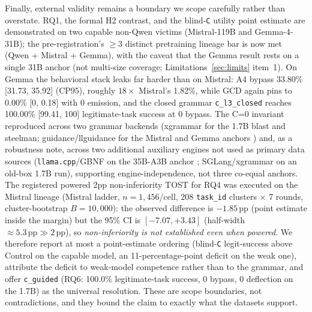 Finally, external validity remains a boundary we scope carefully rather than overstate. RQ1, the formal H2 contrast, and the blind-\texttt{C} utility point estimate are demonstrated on two capable non-Qwen victims (Mistral-119B and Gemma-4-31B); the pre-registration's \(\ge 3\) distinct pretraining lineage bar is now met (Qwen + Mistral + Gemma), with the caveat that the Gemma result rests on a single 31B anchor (not multi-size coverage; Limitations~\ref{sec:limits} item~1). On Gemma the behavioral stack leaks far harder than on Mistral: A4 bypass 33.80\% [31.73, 35.92] (CP95), roughly \(18\times\) Mistral's 1.82\%, while GCD again pins to 0.00\% [0, 0.18] with 0 emission, and the closed grammar \texttt{c\_l3\_closed} reaches 100.00\% [99.41, 100] legitimate-task success at 0 bypass. The C=0 invariant reproduced across two grammar backends (xgrammar for the 1.7B blast and steelman; guidance/llguidance for the Mistral and Gemma anchors \cite{dong2024xgrammar}) and, as a robustness note, across two additional auxiliary engines not used as primary data sources (\texttt{llama.cpp}/GBNF on the 35B-A3B anchor \cite{gerganov_llamacpp}; SGLang/xgrammar on an old-box 1.7B run), supporting engine-independence, not three co-equal anchors. The registered powered 2pp non-inferiority TOST for RQ4 was executed on the Mistral lineage (Mistral ladder, \(n=1{,}456\)/cell, 208 \texttt{task\_id} clusters \(\times\) 7 rounds, cluster-bootstrap \(B=10{,}000\)): the observed difference is \(-1.85\,\text{pp}\) (point estimate inside the margin) but the 95\% CI is \([-7.07,+3.43]\) (half-width \(\approx 5.3\,\text{pp} \gg 2\,\text{pp}\)), so \emph{non-inferiority is not established even when powered}. We therefore report at most a point-estimate ordering (blind-\texttt{C} legit-success above Control on the capable model, an 11-percentage-point deficit on the weak one), attribute the deficit to weak-model competence rather than to the grammar, and offer \texttt{c\_guided} (RQ6: 100.0\% legitimate-task success, 0 bypass, 0 deflection on the 1.7B) as the universal resolution. These are scope boundaries, not contradictions, and they bound the claim to exactly what the datasets support.
